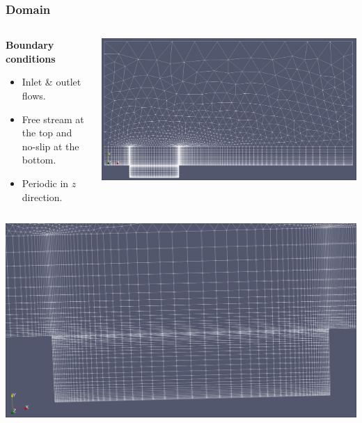 \documentclass[
	aspectratio=169, %
	t, %
	onlytextwidth, %
	10pt, %
]{beamer}
\begin{document}
\begin{frame}
	\frametitle{Domain}

	\begin{columns}[T] %
		\begin{column}{0.28\linewidth} %
			\textbf{Boundary conditions}
			\begin{itemize}
				\item Inlet \& outlet flows.
				\item Free stream at the top and no-slip at the bottom.
				\item Periodic in $z$ direction.

			\end{itemize}
		\end{column}
		\begin{column}{0.68\linewidth} %
			\includegraphics[width=\linewidth]{Images/mesh.png} %
			{\tiny\textcolor{ICLBlue}{}}
		\end{column}
	\end{columns}
\end{frame}

\begin{frame}
	\begin{center}
    \includegraphics[width=0.7\linewidth]{Images/mesh_gap.png}
	\end{center}
	
\end{frame}
\end{document}
